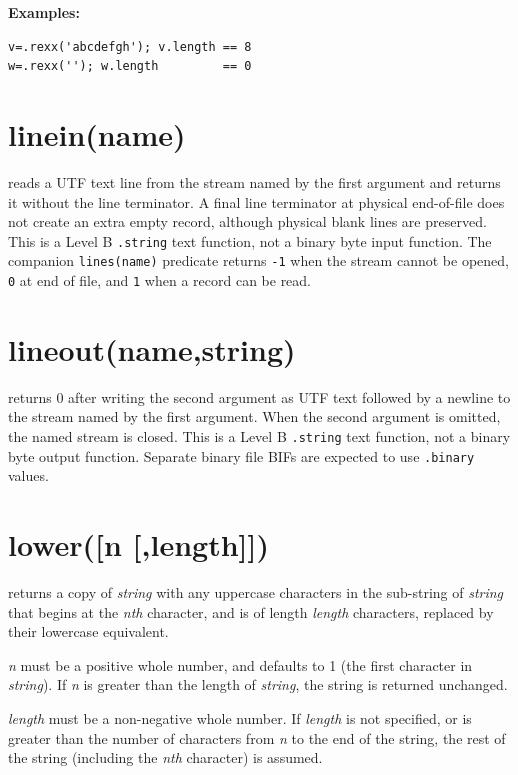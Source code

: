 \textbf{Examples:}
\begin{lstlisting}
v=.rexx('abcdefgh'); v.length == 8
w=.rexx(''); w.length         == 0
\end{lstlisting}

\section{linein(name)} reads a UTF text line from the stream named by the first
argument and returns it without the line terminator. A final line terminator at
physical end-of-file does not create an extra empty record, although physical
blank lines are preserved. This is a Level B \texttt{.string} text function,
not a binary byte input function. The companion \texttt{lines(name)} predicate
returns \texttt{-1} when the stream cannot be opened, \texttt{0} at end of file,
and \texttt{1} when a record can be read.

\section{lineout(name,string)} returns 0 after writing the second argument as
UTF text followed by a newline to the stream named by the first argument. When
the second argument is omitted, the named stream is closed. This is a Level B
\texttt{.string} text function, not a binary byte output function. Separate
binary file BIFs are expected to use \texttt{.binary} values.

\section{lower([n [,length{]}])}\label{reflower}

returns a copy of \emph{string} with any uppercase characters in
the sub-string of \emph{string} that begins at the \emph{n}\emph{th}
character, and is of length \emph{length} characters, replaced by
their lowercase equivalent.
 
\emph{n} must be a positive whole number, and defaults to 1 (the
first character in \emph{string}).  If \emph{n} is greater than
the length of \emph{string}, the string is returned unchanged.
 
\emph{length} must be a non-negative whole number.
If \emph{length} is not specified, or is greater than the number of
characters from \emph{n} to the end of the string, the rest of the
string (including the \emph{n}\emph{th} character) is assumed.
 

